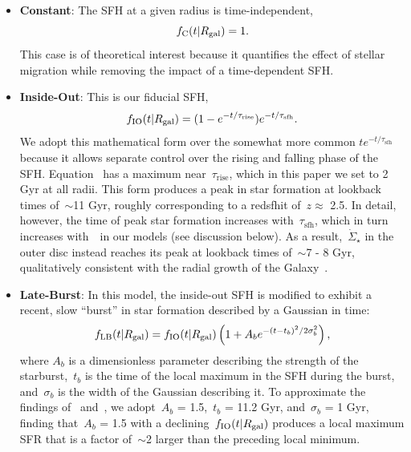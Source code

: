\documentclass[draft2.tex]{subfiles}
\begin{document}
\begin{itemize} 
	\item \textbf{Constant}: The SFH at a given radius is time-independent, 
	\begin{equation} 
	f_\text{C}(t|R_\text{gal}) = 1. 
	\label{eq:constant_sfh} 
	\end{equation} 
	This case is of theoretical interest because it quantifies the effect of 
	stellar migration while removing the impact of a time-dependent SFH. 

	\item \textbf{Inside-Out}: This is our fiducial SFH, 
	\begin{equation} 
	f_\text{IO}(t|R_\text{gal}) = (1 - e^{-t / \tau_\text{rise}}) 
	e^{-t / \tau_\text{sfh}}. 
	\label{eq:insideout_sfh} 
	\end{equation} 
	We adopt this mathematical form over the somewhat more common 
	$te^{-t/\tau_\text{sfh}}$ because it allows separate control over the 
	rising and falling phase of the SFH. 
	Equation~ has a maximum near~$\tau_\text{rise}$, 
	which in this paper we set to 2 Gyr at all radii. 
	This form produces a peak in star formation at lookback times of~$\sim$11 
	Gyr, roughly corresponding to a redsfhit of~$z \approx$ 2.5. 
	{\color{red} 
	In detail, however, the time of peak star formation increases 
	with~$\tau_\text{sfh}$, which in turn increases with~\rgal~in our models 
	(see discussion below). 
	As a result,~$\dot{\Sigma}_\star$ in the outer disc instead reaches its 
	peak at lookback times of~$\sim$7 - 8 Gyr, qualitatively consistent with 
	the radial growth of the Galaxy~\citep[e.g.][]{Bird2012, Bird2013}. 
	} 

	\item \textbf{Late-Burst}: In this model, the inside-out SFH is modified to 
	exhibit a recent, slow ``burst'' in star formation described by a Gaussian 
	in time: 
	\begin{equation} 
	f_\text{LB}(t|R_\text{gal}) = f_\text{IO}(t|R_\text{gal}) 
	\left(1 + A_be^{-(t - t_b)^2/2\sigma_b^2}\right), 
	\label{eq:lateburst_sfh} 
	\end{equation} 
	where $A_b$ is a dimensionless parameter describing the strength of the 
	starburst,~$t_b$ is the time of the local maximum in the SFH during the 
	burst, and~$\sigma_b$ is the width of the Gaussian describing it. 
	To approximate the findings of~\citet{Mor2019} and~\citet{Isern2019}, we 
	adopt~$A_b$ = 1.5,~$t_b$ = 11.2 Gyr, and~$\sigma_b$ = 1 Gyr, finding 
	that~$A_b$ = 1.5 with a declining~$f_\text{IO}(t|R_\text{gal})$ produces a local 
	maximum SFR that is a factor of~$\sim$2 larger than the preceding local 
	minimum. 


\end{itemize}
\end{document}
